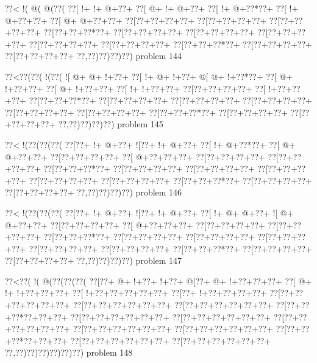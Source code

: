 \vbox{\vbox{\goo
\0??<\- !(\- @(\- @(\0??(
\0??[\- !+\- !+\- @+\0??+
\0??[\- @+\- !+\- @+\0??+
\0??[\- !+\- @+\0??*\0??+
\0??[\- !+\- @+\0??+\0??+
\0??[\- @+\- @+\0??+\0??+
\0??[\0??+\0??+\0??+\0??+
\0??[\0??+\0??+\0??+\0??+
\0??[\0??+\0??+\0??+\0??+
\0??[\0??+\0??+\0??*\0??+
\0??[\0??+\0??+\0??+\0??+
\0??[\0??+\0??+\0??+\0??+
\0??[\0??+\0??+\0??+\0??+
\0??[\0??+\0??+\0??+\0??+
\0??[\0??+\0??+\0??+\0??+
\0??[\0??+\0??+\0??*\0??+
\0??[\0??+\0??+\0??+\0??+
\0??[\0??+\0??+\0??+\0??+
\0??,\0??)\0??)\0??)\0??)
}
\hfil problem 144\hfil\break
}

\vbox{\vbox{\goo
\0??<\0??(\0??(\- !(\0??(
\- ![\- @+\- @+\- !+\0??+
\0??[\- !+\- @+\- !+\0??+
\- @[\- @+\- !+\0??*\0??+
\0??[\- @+\- !+\0??+\0??+
\0??[\- @+\- !+\0??+\0??+
\0??[\- !+\- !+\0??+\0??+
\0??[\0??+\0??+\0??+\0??+
\0??[\- !+\0??+\0??+\0??+
\0??[\0??+\0??+\0??*\0??+
\0??[\0??+\0??+\0??+\0??+
\0??[\0??+\0??+\0??+\0??+
\0??[\0??+\0??+\0??+\0??+
\0??[\0??+\0??+\0??+\0??+
\0??[\0??+\0??+\0??+\0??+
\0??[\0??+\0??+\0??*\0??+
\0??[\0??+\0??+\0??+\0??+
\0??[\0??+\0??+\0??+\0??+
\0??,\0??)\0??)\0??)\0??)
}
\hfil problem 145\hfil\break
}

\vbox{\vbox{\goo
\0??<\- !(\0??(\0??(\0??(
\0??[\0??+\- !+\- @+\0??+
\- ![\0??+\- !+\- @+\0??+
\0??[\- !+\- @+\0??*\0??+
\0??[\- @+\- @+\0??+\0??+
\0??[\0??+\0??+\0??+\0??+
\0??[\- @+\0??+\0??+\0??+
\0??[\0??+\0??+\0??+\0??+
\0??[\0??+\0??+\0??+\0??+
\0??[\0??+\0??+\0??*\0??+
\0??[\0??+\0??+\0??+\0??+
\0??[\0??+\0??+\0??+\0??+
\0??[\0??+\0??+\0??+\0??+
\0??[\0??+\0??+\0??+\0??+
\0??[\0??+\0??+\0??+\0??+
\0??[\0??+\0??+\0??*\0??+
\0??[\0??+\0??+\0??+\0??+
\0??[\0??+\0??+\0??+\0??+
\0??,\0??)\0??)\0??)\0??)
}
\hfil problem 146\hfil\break
}

\vbox{\vbox{\goo
\0??<\- !(\0??(\0??(\0??(
\0??[\0??+\- !+\- @+\0??+
\- ![\0??+\- !+\- @+\0??+
\0??[\- !+\- @+\- @+\0??+
\- ![\- @+\- @+\0??+\0??+
\0??[\0??+\0??+\0??+\0??+
\0??[\- @+\0??+\0??+\0??+
\0??[\0??+\0??+\0??+\0??+
\0??[\0??+\0??+\0??+\0??+
\0??[\0??+\0??+\0??*\0??+
\0??[\0??+\0??+\0??+\0??+
\0??[\0??+\0??+\0??+\0??+
\0??[\0??+\0??+\0??+\0??+
\0??[\0??+\0??+\0??+\0??+
\0??[\0??+\0??+\0??+\0??+
\0??[\0??+\0??+\0??*\0??+
\0??[\0??+\0??+\0??+\0??+
\0??[\0??+\0??+\0??+\0??+
\0??,\0??)\0??)\0??)\0??)
}
\hfil problem 147\hfil\break
}

\vbox{\vbox{\goo
\0??<\0??(\- !(\- @(\0??(\0??(\0??(
\0??[\0??+\- @+\- !+\0??+\- !+\0??+
\- @[\0??+\- @+\- !+\0??+\0??+\0??+
\0??[\- @+\- !+\- !+\0??+\0??+\0??+
\0??[\- !+\0??+\0??+\0??+\0??+\0??+
\0??[\0??+\- !+\0??+\0??+\0??+\0??+
\0??[\0??+\0??+\0??+\0??+\0??+\0??+
\0??[\0??+\0??+\0??+\0??+\0??+\0??+
\0??[\0??+\0??+\0??+\0??+\0??+\0??+
\0??[\0??+\0??+\0??*\0??+\0??+\0??+
\0??[\0??+\0??+\0??+\0??+\0??+\0??+
\0??[\0??+\0??+\0??+\0??+\0??+\0??+
\0??[\0??+\0??+\0??+\0??+\0??+\0??+
\0??[\0??+\0??+\0??+\0??+\0??+\0??+
\0??[\0??+\0??+\0??+\0??+\0??+\0??+
\0??[\0??+\0??+\0??*\0??+\0??+\0??+
\0??[\0??+\0??+\0??+\0??+\0??+\0??+
\0??[\0??+\0??+\0??+\0??+\0??+\0??+
\0??,\0??)\0??)\0??)\0??)\0??)\0??)
}
\hfil problem 148\hfil\break
}

